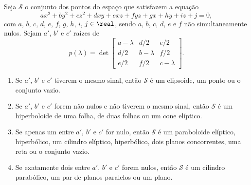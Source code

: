 \begin{teorema}
  Seja $\mathcal{S}$ o conjunto dos pontos do espaço que satisfazem a equação
  \[
    ax^2 + by^2 + cz^2 + dxy + exz + fyz + gx + hy + iz + j = 0,
  \]
  com $a$, $b$, $c$, $d$, $e$, $f$, $g$, $h$, $i$, $j \in \real$, sendo $a$, $b$, $c$, $d$, $e$ e $f$ não simultaneamente nulos. Sejam $a'$, $b'$ e $c'$ raízes de
  \[
    p(\lambda) = \det \begin{bmatrix}
      a - \lambda & d/2 & e/2 \\
      d/2 & b - \lambda & f/2\\
      e/2 & f/2 & c - \lambda
    \end{bmatrix}.
  \]
  \begin{enumerate}[label=({\roman*})]
    \item Se $a'$, $b'$ e $c'$ tiverem o mesmo sinal, então $\mathcal{S}$ é um elipsoide, um ponto ou o conjunto vazio.
    \item Se $a'$, $b'$ e $c'$ forem não nulos e não tiverem o mesmo sinal, então $\mathcal{S}$ é um hiperboloide de uma folha, de duas folhas ou um cone elíptico.
    \item Se apenas um entre $a'$, $b'$ e $c'$ for nulo, então $\mathcal{S}$ é um paraboloide elíptico, hiperbólico, um cilindro elíptico, hiperbólico, dois planos concorrentes, uma reta ou o conjunto vazio.
    \item Se exatamente dois entre $a'$, $b'$ e $c'$ forem nulos, então $\mathcal{S}$ é um cilindro parabólico, um par de planos paralelos ou um plano.
  \end{enumerate}
\end{teorema}

